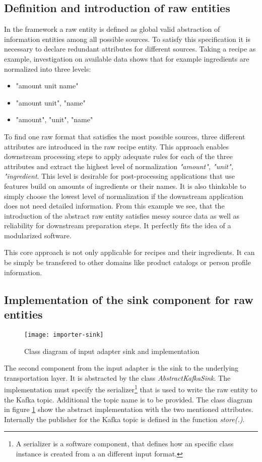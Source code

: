 \subsection{Definition and introduction of raw entities}
In the framework a raw entity is defined as global valid abstraction of information entities among all possible sources. To satisfy this specification it is necessary to declare redundant attributes for different sources. Taking a recipe as example, investigation on available data shows that for example ingredients are normalized into three levels:
\begin{itemize}
\item "amount unit name"
\item "amount unit", "name"
\item "amount", "unit", "name"
\end{itemize}
To find one raw format that satisfies the most possible sources, three different attributes are introduced in the raw recipe entity. This approach enables downstream processing steps to apply adequate rules for each of the three attributes and extract the highest level of normalization \textit{"amount", "unit", "ingredient}. This level is desirable for post-processing applications that use features build on amounts of ingredients or their names. It is also thinkable to simply choose the lowest level of normalization if the downstream application does not need detailed information. From this example we see, that the introduction of the abstract raw entity satisfies messy source data as well as reliability for downstream preparation steps. It perfectly fits the idea of a modularized software.

This core approach is not only applicable for recipes and their ingredients. It can be simply be transfered to other domains like product catalogs or person profile information.

\subsection{Implementation of the sink component for raw entities}

\begin{figure}[htb]
  \centering
  \texttt{[image: importer-sink]}\\
  \caption{Class diagram of input adapter sink and implementation}
  \label{fig:importer-sink}
\end{figure}

The second component from the input adapter is the sink to the underlying transportation layer. It is abstracted by the class \textit{AbstractKafkaSink}. The implementation must specify the serializer\footnote{A serializer is a software component, that defines how an specific class instance is created from a an different input format.} that is used to write the raw entity to the Kafka topic. Additional the topic name is to be provided. The class diagram in figure  \ref{fig:importer-sink} show the abstract implementation with the two mentioned attributes. Internally the publisher for the Kafka topic is defined in the function \textit{store(.)}.

